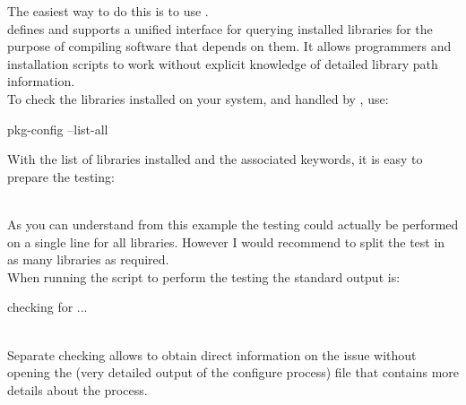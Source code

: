 The easiest way to do this is to use \href{https://en.wikipedia.org/wiki/Pkg-config}{}. \\
 defines and supports a unified interface for querying installed libraries for the purpose of compiling software that depends on them. 
It allows programmers and installation scripts to work without explicit knowledge of detailed library path information.\\ 
To check the libraries installed on your system, and handled by , use: 
\begin{script}
\fprompt{~} pkg-config --list-all
\end{script}
\clearpage
\noindent With the list of libraries installed and the associated keywords, it is easy to prepare the testing:
{\footnotesize{
\begin{script}





\end{script}
}}
\\
\noindent As you can understand from this example the testing could actually be performed on a single line for all libraries. 
However I would recommend to split the test in as many libraries as required. \\[0.25cm]
When running the  script to perform the testing the standard output is:
{\footnotesize{
\begin{script}
checking for ... 
\end{script}
}}
\\
\noindent Separate checking allows to obtain direct information on the issue without opening the  (very detailed output of the configure process) 
file that contains more details about the process. 

